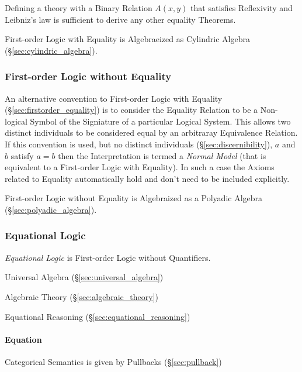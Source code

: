 Defining a theory with a Binary Relation $A(x,y)$ that satisfies
Reflexivity and Leibniz's law is sufficient to derive any other
equality Theorems.

First-order Logic with Equality is Algebraeized as Cylindric Algebra
(\S\ref{sec:cylindric_algebra}).



\subsubsection{First-order Logic without Equality}
\label{sec:firstorder_no_equality}

An alternative convention to First-order Logic with Equality
(\S\ref{sec:firstorder_equality}) is to consider the Equality Relation
to be a Non-logical Symbol of the Signiature of a particular Logical
System. This allows two distinct individuals to be considered equal by
an arbitraray Equivalence Relation. If this convention is used, but no
distinct individuals (\S\ref{sec:discernibility}), $a$ and $b$ satisfy
$a=b$ then the Interpretation is termed a \emph{Normal Model} (that is
equivalent to a First-order Logic with Equality). In such a case the
Axioms related to Equality automatically hold and don't need to be
included explicitly.

First-order Logic without Equality is Algebraized as a Polyadic
Algebra (\S\ref{sec:polyadic_algebra}).



\subsubsection{Equational Logic}\label{sec:equational_logic}

\emph{Equational Logic} is First-order Logic without Quantifiers.

Universal Algebra (\S\ref{sec:universal_algebra})

Algebraic Theory (\S\ref{sec:algebraic_theory})

Equational Reasoning (\S\ref{sec:equational_reasoning})



\paragraph{Equation}\label{sec:equation}\hfill


Categorical Semantics is given by Pullbacks (\S\ref{sec:pullback})



